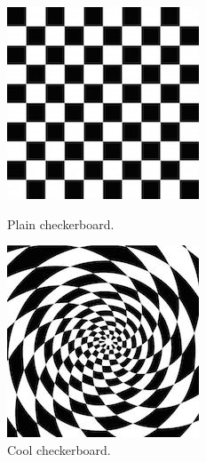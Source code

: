 \documentclass[pageno]{jpaper}
\begin{document}
\begin{figure}[htbb]
	\begin{minipage}[b]{0.5\linewidth}
		\centering
		\includegraphics[width=.75\linewidth]{checkerboard-squares-black-white.jpg}
		\caption{Plain checkerboard.}
		\label{fig:side-a}
	\end{minipage}
	\hspace{0.5cm}
	\begin{minipage}[b]{0.5\linewidth}
		\centering
		\includegraphics[width=.75\linewidth]{swirl-squares-black-white.jpg}
		\caption{Cool checkerboard.}
		\label{fig:side-b}
	\end{minipage}
\end{figure}
\end{document}
